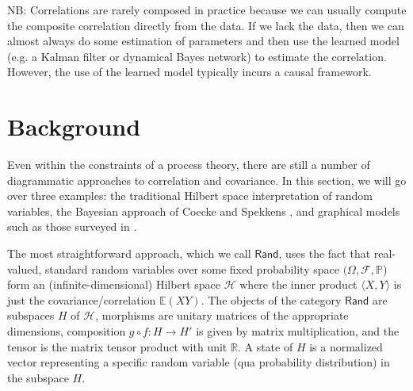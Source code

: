 \documentclass{sig-alternate-05-2015}
\theoremstyle{plain}
\theoremstyle{plain}
\theoremstyle{remark}
\newcommand{\Cat}[1]{\mathsf{#1}}
\def\Bayes{\Cat{Bayes}}
\def\Rand{\Cat{Rand}}
\begin{document}


NB: Correlations are rarely composed in practice because we can usually compute the composite correlation directly from the data. If we lack the data, then we can almost always do some estimation of parameters and then use the learned model (e.g. a Kalman filter or dynamical Bayes network) to estimate the correlation. However, the use of the learned model typically incurs a causal framework. %



\section{Background}
Even within the constraints of a process theory, there are still a number of diagrammatic approaches to correlation and covariance. In this section, we will go over three examples: the traditional Hilbert space interpretation of random variables, the Bayesian approach of Coecke and Spekkens \cite{coecke_spekkens}, and graphical models such as those surveyed in \cite{lauritzen96}. %

The most straightforward approach, which we call $\Rand$, uses the fact that real-valued, standard random variables over some fixed probability space $(\Omega, \mathcal{F}, \mathbb{P}$) form an (infinite-dimensional) Hilbert space $\mathcal{H}$ where the inner product $\langle X, Y \rangle$ is just the covariance/correlation $\mathbb{E}(XY)$. The objects of the category $\Rand$ are subspaces $H$ of $\mathcal{H}$, morphisms are unitary matrices of the appropriate dimensions, composition $g \circ f : H \to H'$ is given by matrix multiplication, and the tensor is the matrix tensor product with unit $\mathbb{R}$. A state of $H$ is a normalized vector representing a specific random variable (qua probability distribution) in the subspace $H$.
\end{document}
